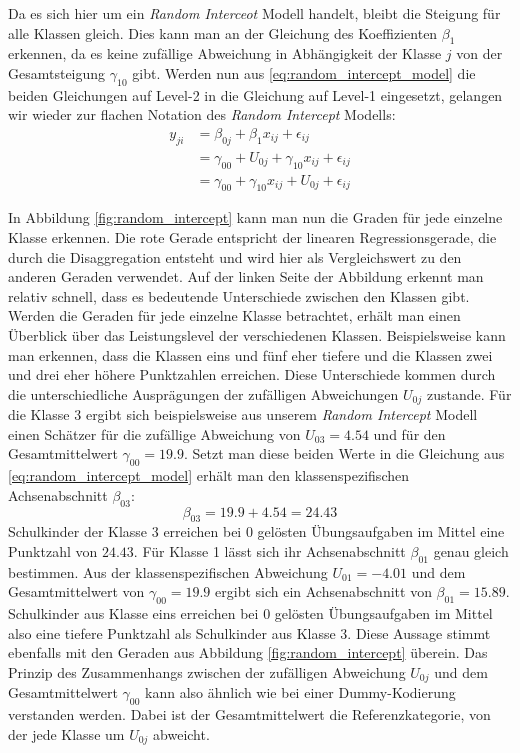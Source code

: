 \documentclass[12pt]{article}\usepackage[]{graphicx}\usepackage[]{color}
\numberwithin{equation}{section}
\begin{document}
Da es sich hier um ein \textit{Random Interceot} Modell handelt, bleibt die Steigung für alle Klassen gleich. Dies kann man an der Gleichung des Koeffizienten $\beta_{1}$ erkennen, da es keine zufällige Abweichung in Abhängigkeit der Klasse $j$ von der Gesamtsteigung $\gamma_{10}$ gibt. Werden nun aus \eqref{eq:random_intercept_model} die beiden Gleichungen auf Level-2 in die Gleichung auf Level-1 eingesetzt, gelangen wir wieder zur flachen Notation des \textit{Random Intercept} Modells:
\begin{equation}
\begin{split}
y_{ji} 	& = \beta_{0j} + \beta_{1}x_{ij} + \epsilon_{ij} \\
		& = \gamma_{00} + U_{0j} + \gamma_{10}x_{ij} + \epsilon_{ij} \\
		& = \gamma_{00} + \gamma_{10}x_{ij} + U_{0j} + \epsilon_{ij}
\end{split}
\end{equation}

In Abbildung \ref{fig:random_intercept} kann man nun die Graden für jede einzelne Klasse erkennen. Die rote Gerade entspricht der linearen Regressionsgerade, die durch die Disaggregation entsteht und wird hier als Vergleichswert zu den anderen Geraden verwendet. Auf der linken Seite der Abbildung erkennt man relativ schnell, dass es bedeutende Unterschiede zwischen den Klassen gibt. Werden die Geraden für jede einzelne Klasse betrachtet, erhält man einen Überblick über das Leistungslevel der verschiedenen Klassen. Beispielsweise kann man erkennen, dass die Klassen eins und fünf eher tiefere und die Klassen zwei und drei eher höhere Punktzahlen erreichen. Diese Unterschiede kommen durch die unterschiedliche Ausprägungen der zufälligen Abweichungen $U_{0j}$ zustande. Für die Klasse 3 ergibt sich beispielsweise aus unserem \textit{Random Intercept} Modell einen Schätzer für die zufällige Abweichung von $U_{03} = 4.54$ und für den Gesamtmittelwert $\gamma_{00} = 19.9$. Setzt man diese beiden Werte in die Gleichung aus \eqref{eq:random_intercept_model} erhält man den klassenspezifischen Achsenabschnitt $\beta_{03}$:
\begin{equation}
\beta_{03} = 19.9 + 4.54 = 24.43
\end{equation} 
Schulkinder der Klasse 3 erreichen bei $0$ gelösten Übungsaufgaben im Mittel eine Punktzahl von $24.43$. Für Klasse 1 lässt sich ihr Achsenabschnitt $\beta_{01}$ genau gleich bestimmen. Aus der klassenspezifischen Abweichung $U_{01} = -4.01$ und dem Gesamtmittelwert von $\gamma_{00} = 19.9$ ergibt sich ein Achsenabschnitt von $\beta_{01} = 15.89$. Schulkinder aus Klasse eins erreichen bei 0 gelösten Übungsaufgaben im Mittel also eine tiefere Punktzahl als Schulkinder aus Klasse 3. Diese Aussage stimmt ebenfalls mit den Geraden aus Abbildung \ref{fig:random_intercept} überein. Das Prinzip des Zusammenhangs zwischen der zufälligen Abweichung $U_{0j}$ und dem Gesamtmittelwert $\gamma_{00}$ kann also ähnlich wie bei einer Dummy-Kodierung verstanden werden. Dabei ist der Gesamtmittelwert die Referenzkategorie, von der jede Klasse um $U_{0j}$ abweicht.
\end{document}
